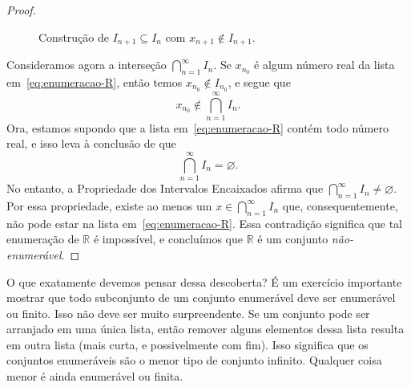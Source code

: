 \begin{proof}
\begin{figure}[htbp]
  \caption{Construção de $I_{n+1}\subseteq I_n$ com
    $x_{n+1}\notin I_{n+1}$.}
  \label{fig:construcao-intervalos-excluindo}
\end{figure}

Consideramos agora a interseção $\bigcap_{n=1}^{\infty} I_{n}$. Se $x_{n_{0}}$ é algum número real da lista em~\eqref{eq:enumeracao-R}, então temos $x_{n_{0}} \notin I_{n_{0}}$, e segue que
\[
x_{n_{0}} \notin \bigcap_{n=1}^{\infty} I_{n}.
\]
Ora, estamos supondo que a lista em~\eqref{eq:enumeracao-R} contém todo número real, e isso leva à conclusão de que
\[
\bigcap_{n=1}^{\infty} I_{n} = \varnothing.
\]
No entanto, a Propriedade dos Intervalos Encaixados afirma que $\bigcap_{n=1}^{\infty} I_{n} \neq \varnothing$. Por essa propriedade, existe ao menos um $x \in \bigcap_{n=1}^{\infty} I_{n}$ que, consequentemente, não pode estar na lista em~\eqref{eq:enumeracao-R}. Essa contradição significa que tal enumeração de $\mathbb{R}$ é impossível, e concluímos que $\mathbb{R}$ é um conjunto \textit{não-enumerável}.
\end{proof}

O que exatamente devemos pensar dessa descoberta? É um exercício importante mostrar que todo subconjunto de um conjunto enumerável deve ser enumerável ou finito. Isso não deve ser muito surpreendente. Se um conjunto pode ser arranjado em uma única lista, então remover alguns elementos dessa lista resulta em outra lista (mais curta, e possivelmente com fim). Isso significa que os conjuntos enumeráveis são o menor tipo de conjunto infinito. Qualquer coisa menor é ainda enumerável ou finita.  

